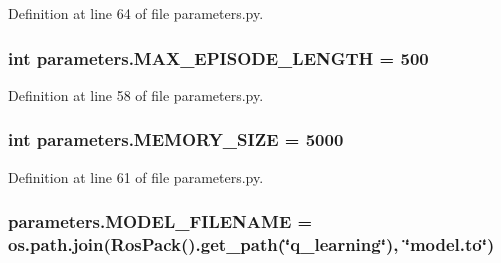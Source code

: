 Definition at line 64 of file parameters.\+py.

\subsubsection[{\texorpdfstring{M\+A\+X\+\_\+\+E\+P\+I\+S\+O\+D\+E\+\_\+\+L\+E\+N\+G\+TH}{MAX_EPISODE_LENGTH}}]{\setlength{\rightskip}{0pt plus 5cm}int parameters.\+M\+A\+X\+\_\+\+E\+P\+I\+S\+O\+D\+E\+\_\+\+L\+E\+N\+G\+TH = 500}\hypertarget{namespaceparameters_aa473cc3b100416af3310c6c5a6d19570}{}\label{namespaceparameters_aa473cc3b100416af3310c6c5a6d19570}


Definition at line 58 of file parameters.\+py.

\subsubsection[{\texorpdfstring{M\+E\+M\+O\+R\+Y\+\_\+\+S\+I\+ZE}{MEMORY_SIZE}}]{\setlength{\rightskip}{0pt plus 5cm}int parameters.\+M\+E\+M\+O\+R\+Y\+\_\+\+S\+I\+ZE = 5000}\hypertarget{namespaceparameters_a49f1ad074b5710a98fc783c5627ddade}{}\label{namespaceparameters_a49f1ad074b5710a98fc783c5627ddade}


Definition at line 61 of file parameters.\+py.

\subsubsection[{\texorpdfstring{M\+O\+D\+E\+L\+\_\+\+F\+I\+L\+E\+N\+A\+ME}{MODEL_FILENAME}}]{\setlength{\rightskip}{0pt plus 5cm}parameters.\+M\+O\+D\+E\+L\+\_\+\+F\+I\+L\+E\+N\+A\+ME = os.\+path.\+join(Ros\+Pack().get\+\_\+path(\char`\"{}q\+\_\+learning\char`\"{}), \char`\"{}model.\+to\char`\"{})}\hypertarget{namespaceparameters_aff8b0668384f3fa2d1212d3bd0ff42fa}{}\label{namespaceparameters_aff8b0668384f3fa2d1212d3bd0ff42fa}


